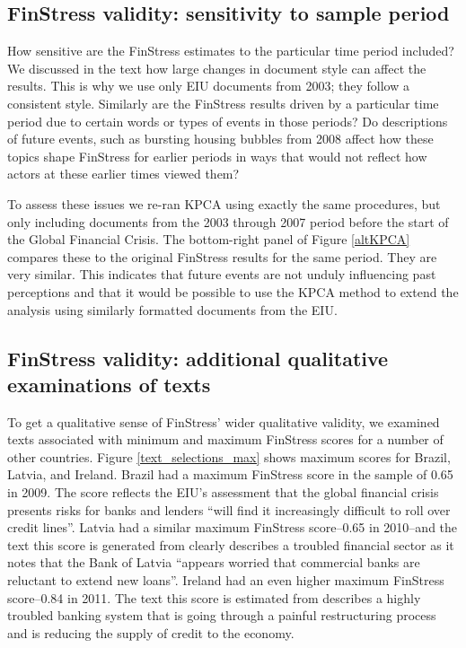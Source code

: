 \documentclass[]{article}
\begin{document}
\subsection*{FinStress validity: sensitivity to sample period}

How sensitive are the FinStress estimates to the particular time period included? We discussed in the text how large changes in document style can affect the results. This is why we use only EIU documents from 2003; they follow a consistent style. Similarly are the FinStress results driven by a particular time period due to certain words or types of events in those periods? Do descriptions of future events, such as bursting housing bubbles from 2008 affect how these topics shape FinStress for earlier periods in ways that would not reflect how actors at these earlier times viewed them?

To assess these issues we re-ran KPCA using exactly the same procedures, but only including documents from the 2003 through 2007 period before the start of the Global Financial Crisis. The bottom-right panel of Figure \ref{altKPCA} compares these to the original FinStress results for the same period. They are very similar. This indicates that future events are not unduly influencing past perceptions and that it would be possible to use the KPCA method to extend the analysis using similarly formatted documents from the EIU.


\subsection*{FinStress validity: additional qualitative examinations of texts}

To get a qualitative sense of FinStress' wider qualitative validity, we examined texts associated with minimum and maximum FinStress scores for a number of other countries. Figure \ref{text_selections_max} shows maximum scores for Brazil, Latvia, and Ireland. Brazil had a maximum FinStress score in the sample of 0.65 in 2009. The score reflects the EIU's assessment that the global financial crisis presents risks for banks and lenders ``will find it increasingly difficult to roll over credit lines''. Latvia had a similar maximum FinStress score--0.65 in 2010--and the text this score is generated from clearly describes a  troubled financial sector as it notes that the Bank of Latvia ``appears worried that commercial banks are reluctant to extend new loans''. Ireland had an even higher maximum FinStress score--0.84 in 2011. The text this score is estimated from describes a highly troubled banking system that is going through a painful restructuring process and is reducing the supply of credit to the economy.
\end{document}
